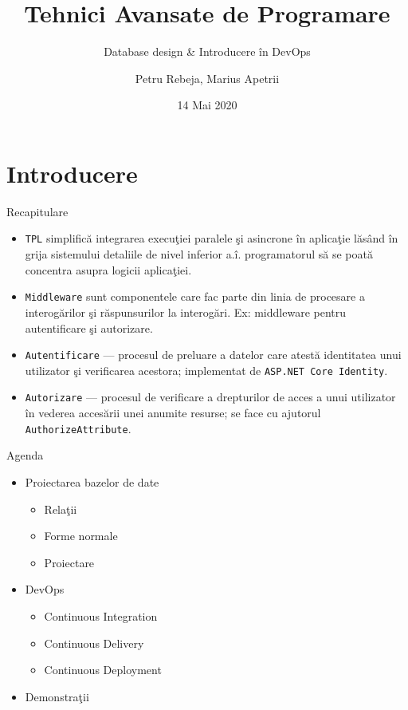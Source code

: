 \documentclass[presentation]{beamer}
\author{Petru Rebeja, Marius Apetrii}
\date{14 Mai 2020}
\title{Tehnici Avansate de Programare}
\subtitle{Database design \& Introducere în DevOps}
\institute[UAIC]{Facultatea de Matematică\\Universitatea Alexandru Ioan Cuza, Iași}
\begin{document}
\maketitle
\section{Introducere}
\label{sec:org40d1ff0}
\begin{frame}[label={sec:org0f5db4e},fragile]{Recapitulare}
 \pause
\begin{itemize}
\item \texttt{TPL} simplifică integrarea execuţiei paralele şi asincrone în aplicaţie lăsând în grija sistemului detaliile de nivel inferior a.î. programatorul să se poată concentra asupra logicii aplicaţiei.
\end{itemize}
\pause
\begin{itemize}
\item \texttt{Middleware} sunt componentele care fac parte din linia de procesare a interogărilor şi răspunsurilor la interogări. Ex: middleware pentru autentificare şi autorizare.
\end{itemize}
\pause
\begin{itemize}
\item \texttt{Autentificare} --- procesul de preluare a datelor care atestă identitatea unui utilizator şi verificarea acestora; implementat de \texttt{ASP.NET Core Identity}.
\end{itemize}
\pause
\begin{itemize}
\item \texttt{Autorizare} --- procesul de verificare a drepturilor de acces a  unui utilizator în vederea accesării unei anumite resurse; se face cu ajutorul \texttt{AuthorizeAttribute}.
\end{itemize}
\end{frame}
\begin{frame}[label={sec:org210611a}]{Agenda}
\begin{itemize}
\item Proiectarea bazelor de date
\begin{itemize}
\item Relaţii
\item Forme normale
\item Proiectare
\end{itemize}
\item DevOps
\begin{itemize}
\item Continuous Integration
\item Continuous Delivery
\item Continuous Deployment
\end{itemize}
\item Demonstraţii
\end{itemize}
\end{frame}
\end{document}
